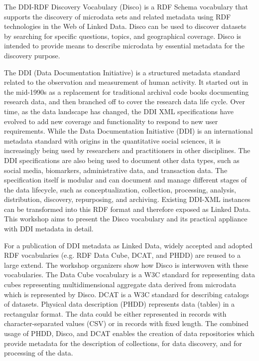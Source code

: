 \documentclass{llncs}
\begin{document}
The DDI-RDF Discovery Vocabulary (Disco) is a RDF Schema vocabulary that supports the discovery of microdata sets and related metadata using RDF technologies in the Web of Linked Data. Disco can be used to discover datasets by searching for specific questions, topics, and geographical coverage. Disco is intended to provide means to describe microdata by essential metadata for the discovery purpose.
 
The DDI (Data Documentation Initiative) is a structured metadata standard related to the observation and measurement of human activity.
It started out in the mid-1990s as a replacement for traditional archival code books documenting research data, and then branched off to cover the research data life cycle. Over time, as the data landscape has
changed, the DDI XML specifications have evolved to add new coverage and functionality to respond to new user requirements.
While the Data Documentation Initiative (DDI) is an international metadata standard with origins in the quantitative social sciences, it is increasingly being used by researchers and practitioners in other disciplines. The DDI specifications are also being used to document other data types, such as social media, biomarkers, administrative data, and transaction data. The specification itself is modular and can document and manage different stages of the data lifecycle, such as conceptualization, collection, processing, analysis, distribution, discovery, repurposing, and archiving.
Existing DDI-XML instances can be transformed into this RDF format and therefore exposed as Linked Data. This workshop aims to present the Disco vocabulary and its practical appliance with DDI metadata in detail.
 
For a publication of DDI metadata as Linked Data, widely accepted and adopted RDF vocabularies (e.g. RDF Data Cube, DCAT, and PHDD) are reused to a large extend. The workshop organizers show how Disco is interwoven with these vocabularies. The Data Cube vocabulary is a W3C standard for representing data cubes representing multidimensional aggregate data derived from microdata which is represented by Disco. DCAT is a W3C standard for describing catalogs of datasets. Physical data description (PHDD) represents data (tables) in a rectangular format. The data could be either represented in records with character-separated values (CSV) or in records with fixed length. The combined usage of PHDD, Disco, and DCAT enables the creation of data repositories which provide metadata for the description of collections, for data discovery, and for processing of the data.
 
\end{document}
